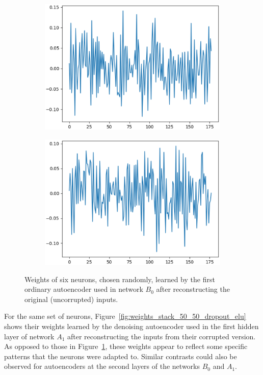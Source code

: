 \documentclass[12pt]{article}
\begin{document}
\begin{figure}
\begin{subfigure}{.5\textwidth}
  \centering
  \includegraphics[width=.8\linewidth]{figures/stack_50_50_dropout_elu_clean_input/weights_neuron_4.eps}
\end{subfigure}
\begin{subfigure}{.5\textwidth}
  \centering
  \includegraphics[width=.8\linewidth]{figures/stack_50_50_dropout_elu_clean_input/weights_neuron_8.eps}
\end{subfigure}
\caption{Weights of six neurons, chosen randomly, learned by the first ordinary autoencoder used in network $B_0$ after reconstructing the original (uncorrupted) inputs.}
\label{fig:weights_stack_50_50_dropout_elu_clean_input}
\end{figure}

For the same set of neurons, Figure~\ref{fig:weights_stack_50_50_dropout_elu} shows their weights learned by the denoising autoencoder used in the first hidden layer of network $A_1$ after reconstructing the inputs from their corrupted version. As opposed to those in Figure~\ref{fig:weights_stack_50_50_dropout_elu_clean_input}, these weights appear to reflect some specific patterns that the neurons were adapted to. Similar contrasts could also be observed for autoencoders at the second layers of the networks $B_0$ and $A_1$.
\end{document}
